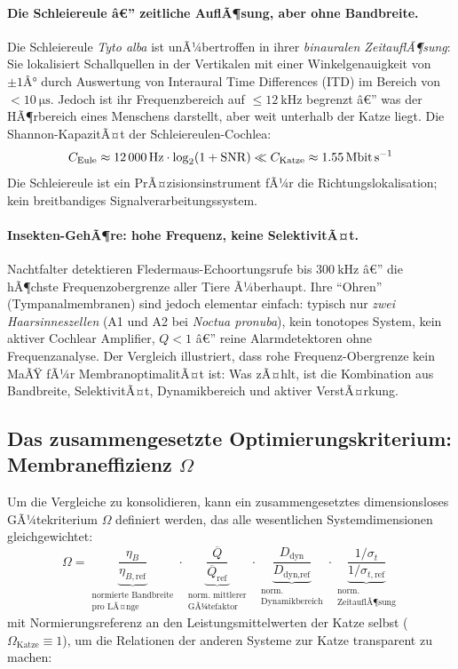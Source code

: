 ﻿\documentclass[12pt,a4paper,titlepage]{report}
\begin{document}
\paragraph{Die Schleiereule â€” zeitliche AuflÃ¶sung, aber ohne Bandbreite.}
Die Schleiereule \textit{Tyto alba} ist unÃ¼bertroffen in ihrer \emph{binauralen
ZeitauflÃ¶sung}: Sie lokalisiert Schallquellen in der Vertikalen mit einer
Winkelgenauigkeit von $\pm 1Â°$ durch Auswertung von Interaural Time Differences
(ITD) im Bereich von $< \SI{10}{\micro\second}$.
Jedoch ist ihr Frequenzbereich auf $\leq \SI{12}{\kilo\hertz}$ begrenzt â€”
was der HÃ¶rbereich eines Menschens darstellt, aber weit unterhalb der Katze liegt.
Die Shannon-KapazitÃ¤t der Schleiereulen-Cochlea:
\[
  C_{\text{Eule}} \approx \SI{12000}{\hertz}\cdot\log_2(1 + \mathrm{SNR})
  \ll C_{\text{Katze}} \approx \SI{1{,}55}{\mega\bit\per\second}
\]
Die Schleiereule ist ein PrÃ¤zisionsinstrument fÃ¼r die Richtungslokalisation;
kein breitbandiges Signalverarbeitungssystem.

\paragraph{Insekten-GehÃ¶re: hohe Frequenz, keine SelektivitÃ¤t.}
Nachtfalter detektieren Fledermaus-Echoortungsrufe bis $\SI{300}{\kilo\hertz}$ â€”
die hÃ¶chste Frequenzobergrenze aller Tiere Ã¼berhaupt.
Ihre ``Ohren'' (Tympanalmembranen) sind jedoch elementar einfach:
typisch nur \emph{zwei Haarsinneszellen} (A1 und A2 bei
\textit{Noctua pronuba}), kein tonotopes System, kein aktiver Cochlear Amplifier,
$Q < 1$ â€” reine Alarmdetektoren ohne Frequenzanalyse.
Der Vergleich illustriert, dass rohe Frequenz-Obergrenze kein MaÃŸ fÃ¼r
MembranoptimalitÃ¤t ist: Was zÃ¤hlt, ist die Kombination aus Bandbreite,
SelektivitÃ¤t, Dynamikbereich und aktiver VerstÃ¤rkung.

\subsection{Das zusammengesetzte Optimierungskriterium: Membraneffizienz $\Omega$}

Um die Vergleiche zu konsolidieren, kann ein zusammengesetztes dimensionsloses
GÃ¼tekriterium $\Omega$ definiert werden, das alle wesentlichen
Systemdimensionen gleichgewichtet:
\[
  \Omega = \underbrace{\frac{\eta_B}{\eta_{B,\text{ref}}}}_{\substack{\text{normierte Bandbreite}\\\text{pro LÃ¤nge}}}
  \cdot
  \underbrace{\frac{\overline{Q}}{\overline{Q}_{\text{ref}}}}_{\substack{\text{norm.\ mittlerer}\\\text{GÃ¼tefaktor}}}
  \cdot
  \underbrace{\frac{D_{\text{dyn}}}{D_{\text{dyn,ref}}}}_{\substack{\text{norm.}\\\text{Dynamikbereich}}}
  \cdot
  \underbrace{\frac{1/\sigma_t}{1/\sigma_{t,\text{ref}}}}_{\substack{\text{norm.}\\\text{ZeitauflÃ¶sung}}}
\]
mit Normierungsreferenz an den Leistungsmittelwerten der Katze selbst
($\Omega_{\text{Katze}} \equiv 1$), um die Relationen der anderen Systeme
zur Katze transparent zu machen:
\end{document}
